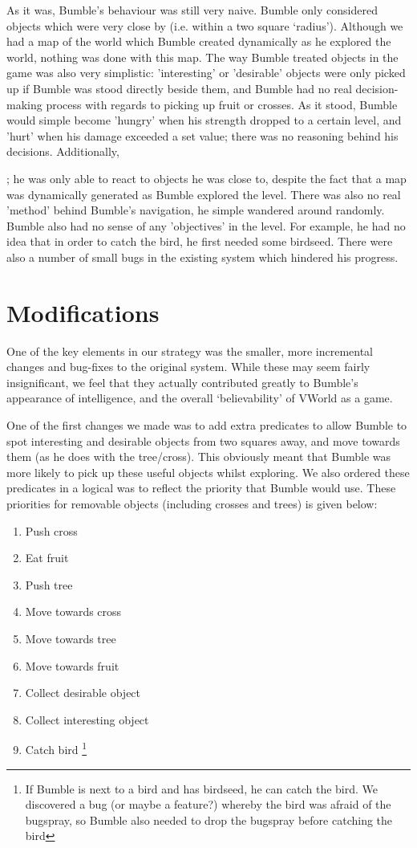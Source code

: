 \documentclass[a4paper,oneside]{report}
\begin{document}
As it was, Bumble's behaviour was still very naive. Bumble only considered objects which were very close by (i.e. within a two square `radius'). Although we had a map of the world which Bumble created dynamically as he explored the world, nothing was done with this map. The way Bumble treated objects in the game was also very simplistic: 'interesting' or 'desirable' objects were only picked up if Bumble was stood directly beside them, and Bumble had no real decision-making process with regards to picking up fruit or crosses. As it stood, Bumble would simple become 'hungry' when his strength dropped to a certain level, and 'hurt' when his damage exceeded a set value; there was no reasoning behind his decisions. Additionally, 

; he was only able to react to objects he was close to, despite the fact that a map was dynamically generated as Bumble explored the level. There was also no real 'method' behind Bumble's navigation, he simple wandered around randomly. Bumble also had no sense of any 'objectives' in the level. For example, he had no idea that in order to catch the bird, he first needed some birdseed. There were also a number of small bugs in the existing system which hindered his progress. 

\section{Modifications}

One of the key elements in our strategy was the smaller, more incremental changes and bug-fixes to the original system. While these may seem fairly insignificant, we feel that they actually contributed greatly to Bumble's appearance of intelligence, and the overall `believability' of VWorld as a game.

One of the first changes we made was to add extra predicates to allow Bumble to spot interesting and desirable objects from two squares away, and move towards them (as he does with the tree/cross). This obviously meant that Bumble was more likely to pick up these useful objects whilst exploring. We also ordered these predicates in a logical was to reflect the priority that Bumble would use. These priorities for removable objects (including crosses and trees) is given below:

\begin{enumerate}
	\item Push cross
	\item Eat fruit
	\item Push tree
	\item Move towards cross
	\item Move towards tree
	\item Move towards fruit
	\item Collect desirable object
	\item Collect interesting object
	\item Catch bird \footnote{If Bumble is next to a bird and has birdseed, he can catch the bird. We discovered a bug (or maybe a feature?) whereby the bird was afraid of the bugspray, so Bumble also needed to drop the bugspray before catching the bird}
\end{enumerate}
\end{document}
